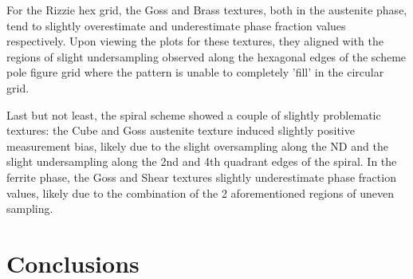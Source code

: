 \documentclass{article}
\begin{document}
For the Rizzie hex grid, the Goss and Brass textures, both in the austenite phase, tend to slightly overestimate and underestimate phase fraction values respectively. Upon viewing the plots for these textures, they aligned with the regions of slight undersampling observed along the hexagonal edges of the scheme pole figure grid where the pattern is unable to completely 'fill' in the circular grid.

Last but not least, the spiral scheme showed a couple of slightly problematic textures: the Cube and Goss austenite texture induced slightly positive measurement bias, likely due to the slight oversampling along the ND and the slight undersampling along the 2nd and 4th quadrant edges of the spiral. In the ferrite phase, the Goss and Shear textures slightly underestimate phase fraction values, likely due to the combination of the 2 aforementioned regions of uneven sampling.




\section{Conclusions}

\end{document}
